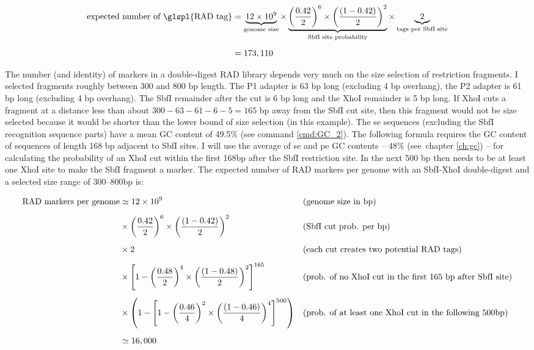 \documentclass[a4paper,12pt,times,print,index,custombib,custommargin]{PhDThesisPSnPDF}\usepackage[]{graphicx}\usepackage[]{color}
\begin{document}
\scriptsize
\begin{align}
\text{expected number of \glspl{RAD tag}} &= \underbrace{12 \times 10^{9}}_{\text{genome size}} \times 
\underbrace{ \left( \frac{0.42}{2}\right)^{6} \times \left( \frac{(1-0.42)}{2} \right)^{2} }_{\text{SbfI site probability}} \times 
\underbrace{2}_{\text{tags per SbfI site}}
\label{eq:exp_num_standard_RAD_loci} \\[5pt] 
&= 173,110 \nonumber
\end{align}
\normalsize

The number (and identity) of markers in a double-digest RAD library depends very much on the size selection of restriction fragments. I selected fragments roughly between 300 and 800 \gls{bp} length. The P1 adapter is 63 bp long (excluding 4 bp overhang), the P2 adapter is 61 bp long (excluding 4 bp overhang). The \gls{SbfI} remainder after the cut is 6 \gls{bp} long and the \gls{XhoI} remainder is 5 \gls{bp} long. If \gls{XhoI} cuts a fragment at a distance less than about $300 - 63 - 61 -6 -5 = 165$ \gls{bp} away from the SbfI cut site, then this fragment would not be size selected because it would be shorter than the lower bound of size selection (in this example). The \gls{se} sequences (excluding the SbfI recognition sequence parts) have a mean GC content of 49.5\% (see command \ref{cmd:GC_2}). 
The following formula requires the GC content of sequences of length 168 \gls{bp} adjacent to SbfI sites. I will use the average of \gls{se} and \gls{pe} GC contents -- 48\% (see~chapter \ref{ch:gc}) -- for calculating the probability of an XhoI cut within the first 168bp after the SbfI restriction site. In the next 500 \gls{bp} then needs to be at least one \gls{XhoI} site to make the SbfI fragment a marker.
The expected number of RAD markers per genome with an SbfI-XhoI double-digest and a selected size range of 300--800bp is:


\scriptsize
\begin{align} %
\text{RAD markers per genome} &\simeq 12 \times 10^{9} 
	&&\text{(genome size in bp)}  \label{eq:exp_number_ddRAD_loci} \\[5pt]
&\times \left(\frac{0.42}{2}\right)^{6}\times \left(\frac{(1-0.42)}{2}\right)^{2} &&\text{(SbfI cut prob. per bp)} \notag \\[5pt]
&\times 2 
	&&\text{(each cut creates two potential RAD tags)} \notag \\[5pt]
&\times \left[1-\left(\frac{0.48}{2}\right)^{4} \times \left( \frac{(1-0.48)}{2}\right)^{2} \right]^{165} 
	&&\text{(prob. of no XhoI cut in the first 165 bp after SbfI site)} \notag \\[5pt]
&\times \left(1- \left[1-\left(\frac{0.46}{4}\right)^{2} \times \left( \frac{(1-0.46)}{4}\right)^{4} \right]^{500} \right) 
	&&\text{(prob. of at least one XhoI cut in the following 500bp)} \notag \\[5pt]
&\simeq 16,000 \nonumber
\end{align}
\normalsize
\end{document}
